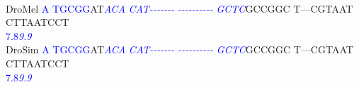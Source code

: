 \documentclass[11pt,twoside,reqno,a4paper]{article}
\begin{document}
{\\
DroMel	\textcolor{Blue}{A}	\textcolor{Blue}{T}\textcolor{Blue}{G}\textcolor{Blue}{C}\textcolor{Blue}{G}\textcolor{Blue}{G}AT\textit{\textcolor{Blue}{A}}\textit{\textcolor{Blue}{C}}\textit{\textcolor{Blue}{A}}	\textit{\textcolor{Blue}{C}}\textit{\textcolor{Blue}{A}}\textit{\textcolor{Blue}{T}}\textit{\textcolor{Blue}{-}}\textit{\textcolor{Blue}{-}}\textit{\textcolor{Blue}{-}}\textit{\textcolor{Blue}{-}}\textit{\textcolor{Blue}{-}}\textit{\textcolor{Blue}{-}}\textit{\textcolor{Blue}{-}}	\textit{\textcolor{Blue}{-}}\textit{\textcolor{Blue}{-}}\textit{\textcolor{Blue}{-}}\textit{\textcolor{Blue}{-}}\textit{\textcolor{Blue}{-}}\textit{\textcolor{Blue}{-}}\textit{\textcolor{Blue}{-}}\textit{\textcolor{Blue}{-}}\textit{\textcolor{Blue}{-}}\textit{\textcolor{Blue}{-}}	\textit{\textcolor{Blue}{G}}\textit{\textcolor{Blue}{C}}\textit{\textcolor{Blue}{T}}\textit{\textcolor{Blue}{C}}GCCGGC	T---CGTAAT	CTTAATCCT\\
\hspace*{7\charwidth}\hspace*{0\charwidth}\textcolor{Blue}{7.8}\hspace*{1\charwidth}\hspace*{5\charwidth}\textit{\textcolor{Blue}{9.9}}\hspace*{1\charwidth}\hspace*{1\charwidth}\hspace*{1\charwidth}\hspace*{1\charwidth}\hspace*{1\charwidth}\\
DroSim	\textcolor{Blue}{A}	\textcolor{Blue}{T}\textcolor{Blue}{G}\textcolor{Blue}{C}\textcolor{Blue}{G}\textcolor{Blue}{G}AT\textit{\textcolor{Blue}{A}}\textit{\textcolor{Blue}{C}}\textit{\textcolor{Blue}{A}}	\textit{\textcolor{Blue}{C}}\textit{\textcolor{Blue}{A}}\textit{\textcolor{Blue}{T}}\textit{\textcolor{Blue}{-}}\textit{\textcolor{Blue}{-}}\textit{\textcolor{Blue}{-}}\textit{\textcolor{Blue}{-}}\textit{\textcolor{Blue}{-}}\textit{\textcolor{Blue}{-}}\textit{\textcolor{Blue}{-}}	\textit{\textcolor{Blue}{-}}\textit{\textcolor{Blue}{-}}\textit{\textcolor{Blue}{-}}\textit{\textcolor{Blue}{-}}\textit{\textcolor{Blue}{-}}\textit{\textcolor{Blue}{-}}\textit{\textcolor{Blue}{-}}\textit{\textcolor{Blue}{-}}\textit{\textcolor{Blue}{-}}\textit{\textcolor{Blue}{-}}	\textit{\textcolor{Blue}{G}}\textit{\textcolor{Blue}{C}}\textit{\textcolor{Blue}{T}}\textit{\textcolor{Blue}{C}}GCCGGC	T---CGTAAT	CTTAATCCT\\
\hspace*{7\charwidth}\hspace*{0\charwidth}\textcolor{Blue}{7.8}\hspace*{1\charwidth}\hspace*{5\charwidth}\textit{\textcolor{Blue}{9.9}}\hspace*{1\charwidth}\hspace*{1\charwidth}\hspace*{1\charwidth}\hspace*{1\charwidth}\hspace*{1\charwidth}\\
}
\end{document}
